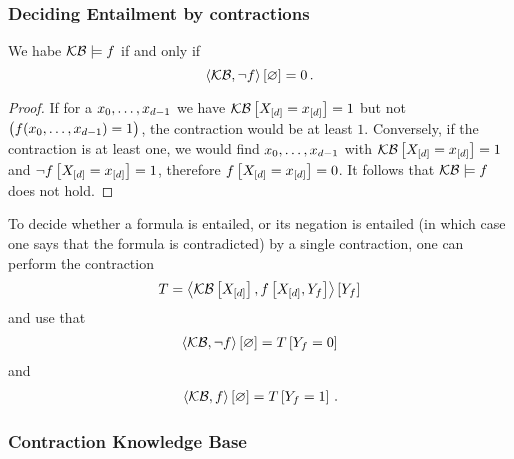 %





\subsubsection{Deciding Entailment by contractions}

\begin{theorem}\label{the:contCriterionLogEntailment}
	We habe $\mathcal{KB}\models f$ if and only if 
		\[ \left\langle \mathcal{KB},\lnot f\right\rangle \left[ \varnothing \right] = 0 \, . \]
\end{theorem}
\begin{proof}
	If for a ${x_{0},\ldots,x_{d-1}}$ we have $\mathcal{KB}\left[X_{[d]}=x_{[d]}\right]=1$ but not $\big(f({x_{0},\ldots,x_{d-1}})=1\big)$, the contraction would be at least $1$.
	Conversely, if the contraction is at least one, we would find ${x_{0},\ldots,x_{d-1}}$ with $\mathcal{KB}\left[X_{[d]}=x_{[d]}\right]=1$ and $\lnot f\left[X_{[d]}=x_{[d]}\right]=1$, therefore $f\left[X_{[d]}=x_{[d]}\right]=0$. 
	It follows that $\mathcal{KB}\models f$ does not hold.
\end{proof}

To decide whether a formula is entailed, or its negation is entailed (in which case one says that the formula is contradicted) by a single contraction, one can perform the contraction
\begin{align*}
	T = \left\langle \mathcal{KB}\left[X_{[d]}\right],f\left[X_{[d]},Y_{f}\right]\right\rangle \left[ Y_{f} \right]
\end{align*}
and use that
\begin{align*}
	 \left\langle \mathcal{KB},\lnot f\right\rangle \left[ \varnothing \right] = T\left[Y_{f}=0\right] 
\end{align*}
and 
\begin{align*}
	 \left\langle \mathcal{KB},f\right\rangle \left[ \varnothing \right] = T\left[Y_{f}=1\right] \, .  
\end{align*}






\subsubsection{Contraction Knowledge Base}

